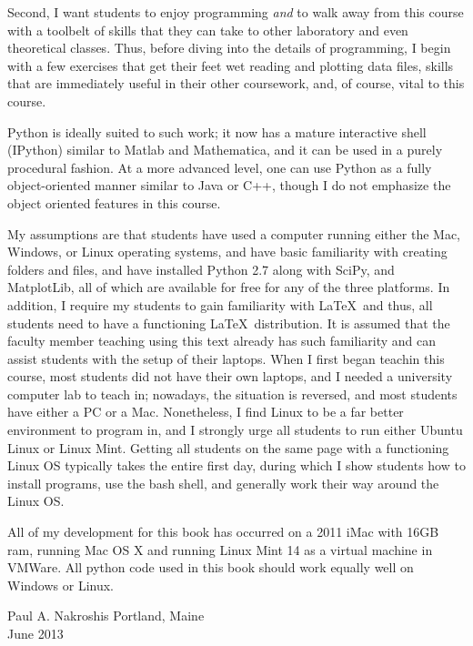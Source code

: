 Second, I want students to enjoy programming \textit{and} to walk away from this course with a toolbelt of skills that they can take to other laboratory  and even theoretical classes. Thus, before diving into the details of programming, I begin with a few exercises that get their feet wet reading and plotting data files, skills that are immediately useful in their other coursework, and, of course, vital to this course. 

Python is ideally suited to such work\cite{oliphant-cise, perez}; it now has a mature interactive shell (IPython) similar to Matlab and Mathematica, and it can be used in a purely procedural fashion. At a more advanced level, one can use Python as a fully object-oriented manner similar to Java or C++, though I do not emphasize the object oriented features in this course.

My assumptions are that students have used a computer running either the Mac, Windows, or Linux operating systems, and have basic familiarity with creating folders and files, and have installed Python 2.7 along with SciPy, and MatplotLib, all of which are available for free for any of the three platforms. In addition, I require my students to gain familiarity with \LaTeX\ and thus, all students need to have a functioning \LaTeX\ distribution. It is assumed that the faculty member teaching using this text already has such familiarity and can assist students with the setup of their laptops. When I first began teachin this course, most students did not have their own laptops, and I needed a university computer lab to teach in; nowadays, the situation is reversed, and most students have either a PC or a Mac. Nonetheless, I find Linux to be a far better environment to program in, and I strongly urge all students to run either Ubuntu Linux or Linux Mint. Getting all students on the same page with a functioning Linux OS typically takes the entire first day, during which I show students how to install programs, use the bash shell, and generally work their way around the Linux OS. 

All of my development for this book has occurred on a 2011 iMac with 16GB ram, running Mac OS X and running Linux Mint 14 as a virtual machine in VMWare.  All python code used in this book should work equally well on Windows or Linux. 




\vspace{1cm}
\begin{flushright}\noindent
Paul A. Nakroshis \hfill Portland, Maine\\
\hfill June 2013 \\
\end{flushright}


